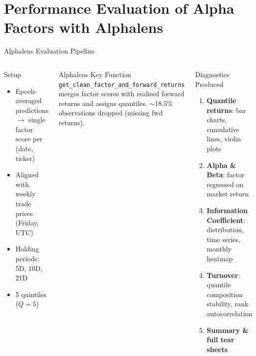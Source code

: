 \documentclass[aspectratio=169, 11pt]{beamer}
\begin{document}
\section{Performance Evaluation of Alpha Factors with Alphalens}
%
\begin{frame}{Alphalens Evaluation Pipeline}

\begin{columns}[T]
\begin{block}{Setup}
\begin{itemize}
  \item Epoch-averaged predictions $\rightarrow$ single factor score per (date, ticker)
  \item Aligned with weekly trade prices (Friday, UTC)
  \item Holding periods: 5D, 10D, 21D
  \item 5 quintiles ($Q=5$)
\end{itemize}
\end{block}

\begin{block}{Alphalens Key Function}
\texttt{get\_clean\_factor\_and\_forward\_returns}\\
merges factor scores with realised forward returns and assigns quantiles. $\sim$18.5\% observations dropped (missing fwd returns).
\end{block}

\begin{block}{Diagnostics Produced}
\begin{enumerate}
  \item \textbf{Quantile returns}: bar charts, cumulative lines, violin plots
  \item \textbf{Alpha \& Beta}: factor regressed on market return
  \item \textbf{Information Coefficient}: distribution, time series, monthly heatmap
  \item \textbf{Turnover}: quantile composition stability, rank autocorrelation
  \item \textbf{Summary \& full tear sheets}
\end{enumerate}
\end{block}
\end{columns}

\end{frame}
%
%
\end{document}

